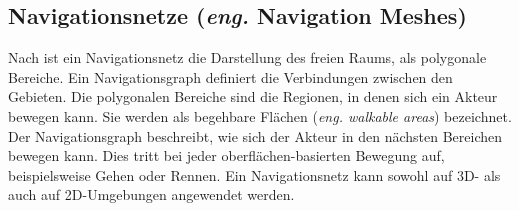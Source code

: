 \subsection{Navigationsnetze (\textit{eng.} Navigation Meshes)}
%
Nach \cite{Mesh:16} ist ein Navigationsnetz die Darstellung des freien Raums, als polygonale Bereiche. Ein Navigationsgraph definiert die Verbindungen zwischen den Gebieten. Die polygonalen Bereiche sind die Regionen, in denen sich ein Akteur bewegen kann. Sie werden als begehbare Flächen (\textit{eng. walkable areas}) bezeichnet. Der Navigationsgraph beschreibt, wie sich der Akteur in den nächsten Bereichen bewegen kann. Dies tritt bei jeder oberflächen-basierten Bewegung auf, beispielsweise Gehen oder Rennen. Ein Navigationsnetz kann sowohl auf 3D- als auch auf 2D-Umgebungen angewendet werden.

